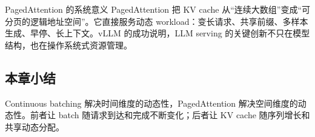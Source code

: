 \begin{importantbox}{PagedAttention 的系统意义}
PagedAttention 把 KV cache 从“连续大数组”变成“可分页的逻辑地址空间”。它直接服务动态 workload：变长请求、共享前缀、多样本生成、早停、长上下文。vLLM 的成功说明，LLM serving 的关键创新不只在模型结构，也在操作系统式资源管理。
\end{importantbox}

\subsection{本章小结}

Continuous batching 解决时间维度的动态性，PagedAttention 解决空间维度的动态性。前者让 batch 随请求到达和完成不断变化；后者让 KV cache 随序列增长和共享动态分配。

